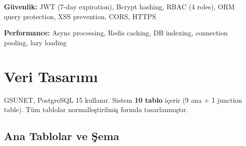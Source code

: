 \documentclass[a4paper,12pt]{report}
\begin{document}
\vspace{0.2cm}

\noindent\textbf{Güvenlik:} JWT (7-day expiration), Bcrypt hashing, RBAC (4 roles), ORM query protection, XSS prevention, CORS, HTTPS

\noindent\textbf{Performance:} Async processing, Redis caching, DB indexing, connection pooling, lazy loading

\section{Veri Tasarımı}

GSUNET, PostgreSQL 15 kullanır. Sistem \textbf{10 tablo} içerir (9 ana + 1 junction table). Tüm tablolar normalleştirilmiş formda tasarlanmıştır.

\subsection{Ana Tablolar ve Şema}
\end{document}

